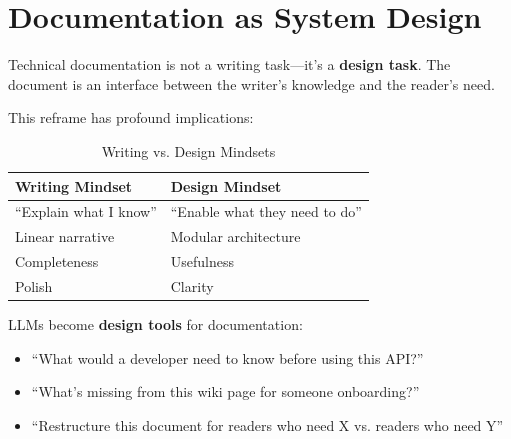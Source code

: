 \chapter{Documentation as System Design}

Technical documentation is not a writing task---it's a \textbf{design task}. The document is an interface between the writer's knowledge and the reader's need.

This reframe has profound implications:

\begin{table}[H]
\centering
\begin{tabular}{ll}
\toprule
\textbf{Writing Mindset} & \textbf{Design Mindset} \\
\midrule
``Explain what I know'' & ``Enable what they need to do'' \\
Linear narrative & Modular architecture \\
Completeness & Usefulness \\
Polish & Clarity \\
\bottomrule
\end{tabular}
\caption{Writing vs. Design Mindsets}
\end{table}

LLMs become \textbf{design tools} for documentation:

\begin{itemize}
    \item ``What would a developer need to know before using this API?''
    \item ``What's missing from this wiki page for someone onboarding?''
    \item ``Restructure this document for readers who need X vs. readers who need Y''
\end{itemize}
